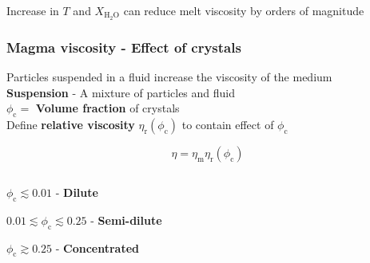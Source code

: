 \documentclass{beamer}
\begin{document}
\begin{frame}
\begin{columns}[t]
\begin{column}{0.45\paperwidth}
    \end{column}

  \end{columns}

  Increase in $T$ and $X_{\text{H}_{2}\text{O}}$ can reduce melt viscosity by orders of magnitude \\
    
\end{frame}
\begin{frame}
  \frametitle{Magma viscosity - Effect of crystals}

  Particles suspended in a fluid increase the viscosity of the medium \\

  \textbf{Suspension} - A mixture of particles and fluid \\

  $\phi_{\text{c}} = $ \textbf{Volume fraction} of crystals \\

  Define \textbf{relative viscosity} $\eta_{\text{r}}(\phi_{\text{c}})$ to contain effect of $\phi_{\text{c}}$

  $$ \eta = \eta_{\text{m}} \eta_{\text{r}}(\phi_{\text{c}}) $$

  \vspace{0.5cm}
  
  \begin{columns}[t]

    \begin{column}{0.5\textwidth}

      $\phi_{\text{c}} \lesssim 0.01$ - \textbf{Dilute} \\

      \vspace{0.5cm}
      
      $0.01 \lesssim \phi_{\text{c}} \lesssim 0.25$ - \textbf{Semi-dilute} \\

      \vspace{0.5cm}
      
      $\phi_{\text{c}} \gtrsim 0.25$ - \textbf{Concentrated} \\

    \end{column}

    \begin{column}{0.5\textwidth}

      \vspace{-1.5cm}
      

\end{column}
\end{columns}
\end{frame}
\end{document}
